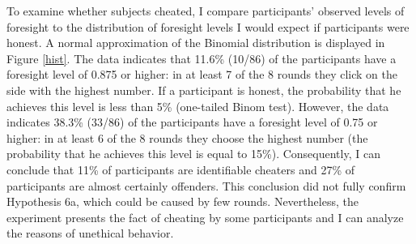 \documentclass[12pt]{article}
\begin{document}
	To examine whether subjects cheated, I compare participants’ observed levels of foresight to the distribution of foresight levels I would expect if participants were honest. A normal approximation of the Binomial distribution is displayed in Figure \ref{hist}. The data indicates that 11.6\% (10/86) of the participants have a foresight level of 0.875 or higher: in at least 7 of the 8 rounds they click on the side with the highest number. If a participant is honest, the probability that he achieves this level is less than 5\% (one-tailed Binom test). However, the data indicates 38.3\% (33/86) of the participants have a foresight level of 0.75 or higher: in at least 6 of the 8 rounds they choose the highest number (the probability that he achieves this level is equal to 15\%). Consequently, I can conclude that 11\% of participants are identifiable cheaters and 27\% of participants are almost certainly offenders. This conclusion did not fully confirm Hypothesis 6a, which could be caused by few rounds. Nevertheless, the experiment presents the fact of cheating by some participants and I can analyze the reasons of unethical behavior.
\end{document}
